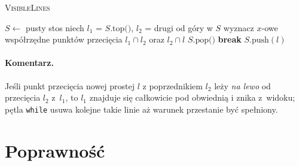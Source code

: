 \documentclass[11pt,a4paper]{article}
\begin{document}
\begin{algorithm}[H]
\caption{\textsc{VisibleLines}}
\begin{algorithmic}[1]
\State $S\gets$ pusty stos
                           
      \State niech $l_1$ = $S\text{.top()}$, $l_2$ = drugi od góry w $S$
      \State wyznacz $x$‐owe współrzędne punktów
             przecięcia $l_1\cap l_2$ oraz $l_2\cap l$
         \State $S.\text{pop()}$  
      \Else \textbf{break}
      \EndIf
   \EndWhile
   \State $S.\text{push}(l)$
\EndFor
\State {}
\end{algorithmic}
\end{algorithm}

\paragraph{Komentarz.}
Jeśli punkt przecięcia nowej prostej $l$
z poprzednikiem $l_2$ leży \emph{na lewo}
od przecięcia $l_2$ z~$l_1$,
to $l_1$ znajduje się całkowicie pod obwiednią
i znika z~widoku; pętla \texttt{while} usuwa
kolejne takie linie aż warunek przestanie być spełniony.

\section*{Poprawność}
\end{document}
